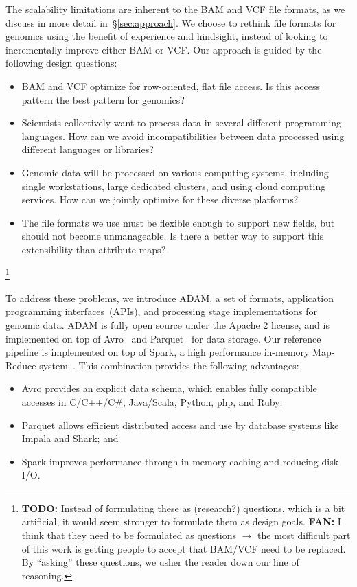 \documentclass{bioinfo}
\newcommand{\todo}[1]{\footnote{\textbf{TODO:} #1}}
\begin{document}
The scalability limitations are inherent to the BAM and VCF file formats, as we discuss in more detail in~\S\ref{sec:approach}. We choose to rethink file formats for genomics
using the benefit of experience and hindsight, instead of looking to incrementally improve either BAM or VCF. Our approach is guided by the following design questions:

\begin{itemize}
\item BAM and VCF optimize for row-oriented, flat file access. Is this access pattern the best pattern for genomics?
\item Scientists collectively want to process data in several different programming languages. How can we avoid incompatibilities between
data processed using different languages or libraries?
\item Genomic data will be processed on various computing systems, including single workstations, large dedicated clusters,
and using cloud computing services. How can we jointly optimize for these diverse platforms?
\item The file formats we use must be flexible enough to support new fields, but should not become unmanageable. Is there a better
way to support this extensibility than attribute maps?
\end{itemize}

\todo{Instead of formulating these as (research?) questions, which is a bit artificial, it would seem stronger to formulate them as design goals. \textbf{FAN:} I think that they
need to be formulated as questions $\rightarrow$ the most difficult part of this work is getting people to accept that BAM/VCF need to be replaced. By ``asking'' these questions,
we usher the reader down our line of reasoning.}

To address these problems, we introduce ADAM, a set of formats, application programming interfaces~(APIs), and processing stage
implementations for genomic data. ADAM is fully open source under the Apache 2 license, and is implemented on top of Avro~\citep{avro}
and Parquet~\citep{parquet} for data storage. Our reference pipeline is implemented on top of Spark, a high performance in-memory Map-Reduce
system~\citep{zaharia10}. This combination provides the following advantages:

\begin{itemize}
\item Avro provides an explicit data schema, which enables fully compatible accesses in C/C++/C\#, Java/Scala, Python, php, and Ruby;
\item Parquet allows efficient distributed access and use by database systems like Impala and Shark; and 
\item Spark improves performance through in-memory caching and reducing disk I/O.
\end{itemize}
\end{document}
